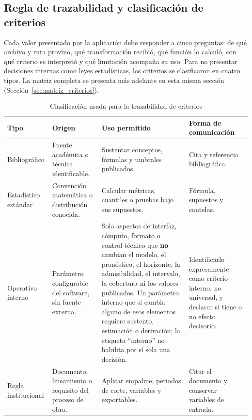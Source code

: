 \documentclass[12pt,letterpaper]{article}
\begin{document}
\subsection{Regla de trazabilidad y clasificación de criterios}
\label{sec:trazabilidad_criterios}

Cada valor presentado por la aplicación debe responder a cinco preguntas: de qué archivo y ruta provino, qué transformación recibió, qué función lo calculó, con qué criterio se interpretó y qué limitación acompaña su uso. Para no presentar decisiones internas como leyes estadísticas, los criterios se clasificaron en cuatro tipos. La matriz completa se presenta más adelante en esta misma sección (Sección~\ref{sec:matriz_criterios}).

\begin{table}[H]
\centering
\caption{Clasificación usada para la trazabilidad de criterios}
\label{tab:clasificacion_criterios}
\vspace{\baselineskip}
\scriptsize
\begin{adjustbox}{max width=\textwidth}
\begin{tabularx}{\textwidth}{@{}p{3.4cm}YYY@{}}
\toprule
\textbf{Tipo} & \textbf{Origen} & \textbf{Uso permitido} & \textbf{Forma de comunicación} \\
\midrule
Bibliográfico & Fuente académica o técnica identificable. & Sustentar conceptos, fórmulas y umbrales publicados. & Cita y referencia bibliográfica. \\
Estadístico estándar & Convención matemática o distribución conocida. & Calcular métricas, cuantiles o pruebas bajo sus supuestos. & Fórmula, supuestos y cautelas. \\
Operativo interno & Parámetro configurable del software, sin fuente externa. & Solo aspectos de interfaz, cómputo, formato o control técnico que \textbf{no} cambian el modelo, el pronóstico, el horizonte, la admisibilidad, el intervalo, la cobertura ni los valores publicados. Un parámetro interno que sí cambia alguno de esos elementos requiere sustento, estimación o derivación; la etiqueta ``interno'' no habilita por sí sola una decisión. & Identificarlo expresamente como criterio interno, no universal, y declarar si tiene o no efecto decisorio. \\
Regla institucional & Documento, lineamiento o requisito del proceso de obra. & Aplicar empalme, periodos de corte, variables y exportables. & Citar el documento y conservar variables de entrada. \\
\bottomrule
\end{tabularx}
\end{adjustbox}
\end{table}
\end{document}
